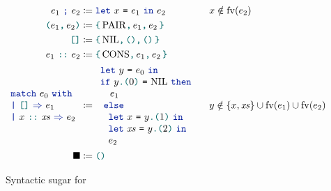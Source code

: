 \begin{figure}[tp]
    \begin{align*}
            \lambdSeq{e_1}{e_2}
            &\coloneqq
            \lambdLet{x}{e_1}{e_2}
            &&
            x \notin \fv{e_2}
        \\
            \lambdPair{e_1}{e_2}
            &\coloneqq
            \lambdConstr{\mathrm{PAIR}}{e_1}{e_2}
        \\
            \lambdNil
            &\coloneqq
            \lambdConstr{\mathrm{NIL}}{\lambdUnit}{\lambdUnit}
        \\
            \lambdCons{e_1}{e_2}
            &\coloneqq
            \lambdConstr{\mathrm{CONS}}{e_1}{e_2}
        \\
            \lambdMatch{e_0}{e_1}{x}{\mathit{xs}}{e_2}
            &\coloneqq
            \begin{array}{l}
                \lambdLet{y}{e_0}{\\
                \lambdIf{
                    \lambdEq{\lambdLoad{y}{0}}{\mathrm{NIL}}
                }{\\ \ \ \ 
                    e_1
                \\}{\\ \ \begin{array}{l}
                    \lambdLet{x}{\lambdLoad{y}{1}}{\\
                    \lambdLet{\mathit{xs}}{\lambdLoad{y}{2}}{\\
                    e_2}}
                \end{array}}}
            \end{array}
            &&
            y \notin \{x, \mathit{xs}\} \cup \fv{e_1} \cup \fv{e_2}
        \\
            \lambdHole
            &\coloneqq
            \lambdUnit
    \end{align*}
    \caption{Syntactic sugar for \LambdaLang}
    \label{fig:sugar}
\end{figure}